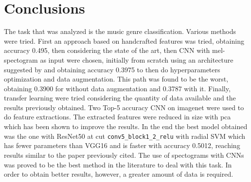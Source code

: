 \section{Conclusions}
The task that was analyzed is the music genre classification.
Various methods were tried.
First an approach based on handcrafted features was tried, obtaining accuracy 0.495, then
considering the state of the art, then CNN with mel-spectogram as input were chosen,
initially from scratch using an architecture suggested by \cite{kostrzewa2021music} and obtaining accuracy 0.3975
to then do hyperparameters optimization and data augmentation. This path was found to be the worst, obtaining 0.3900
for without data augmentation and 0.3787 with it.
Finally, transfer learning were tried considering the quantity of data available and the results previously obtained.
Two Top-5 accuracy CNN on imagenet were used to do feature extractions.
The extracted features were reduced in size with pca which has been shown to improve the results.
In the end the best model obtained was the one with ResNet50 at cut \texttt{conv5\_block1\_2\_relu} with radial SVM which has fewer parameters than VGG16 and is faster
with accuracy 0.5012, reaching results similar to the paper previously cited.
The use of spectograms with CNNs was proved to be the best method in the literature to deal with this task.
In order to obtain better results, however, a greater amount of data is required.
